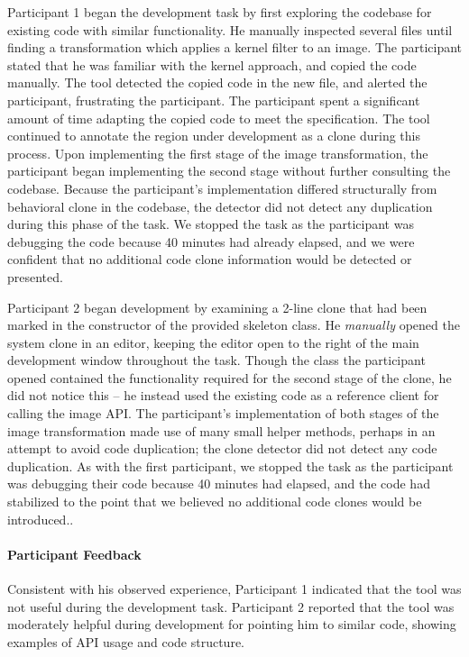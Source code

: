 \documentclass[nocopyrightspace,10pt]{sigplanconf}
\begin{document}
Participant 1 began the development task by first exploring the
codebase for existing code with similar functionality. He manually
inspected several files until finding a transformation which applies a
kernel filter to an image. The participant stated that he was familiar
with the kernel approach, and copied the code manually. The tool
detected the copied code in the new file, and alerted the participant,
frustrating the participant. The participant spent a significant amount of time adapting
the copied code to meet the specification. The tool continued to annotate the region
under development as a clone during this process.
Upon implementing the first stage of the image
transformation, the participant began implementing the second stage
without further consulting the codebase. Because the participant's
implementation differed structurally from behavioral clone in the
codebase, the detector did not detect any duplication during this
phase of the task. We stopped the task as the participant was
debugging the code because 40 minutes had already elapsed, and we were
confident that no additional code clone information would be detected
or presented.

Participant 2 began development by examining a 2-line clone that had
been marked in the constructor of the provided skeleton class.  He
\textit{manually} opened the system clone in an editor, keeping the
editor open to the right of the main development window throughout the
task. Though the class the participant opened contained the
functionality required for the second stage of the clone, he did not
notice this -- he instead used the existing code as a reference client
for calling the image API. The participant's implementation of both
stages of the image transformation made use of many small helper
methods, perhaps in an attempt to avoid code duplication; the clone
detector did not detect any code duplication. As with the first
participant, we stopped the task as the participant was debugging
their code because 40 minutes had elapsed, and the code had stabilized
to the point that we believed no additional code clones would be
introduced..

\paragraph{Participant Feedback}
Consistent with his observed experience, Participant 1 indicated that
the tool was not useful during the development task. Participant 2
reported that the tool was moderately helpful during development for
pointing him to similar code, showing examples of API usage and code
structure.
\end{document}
